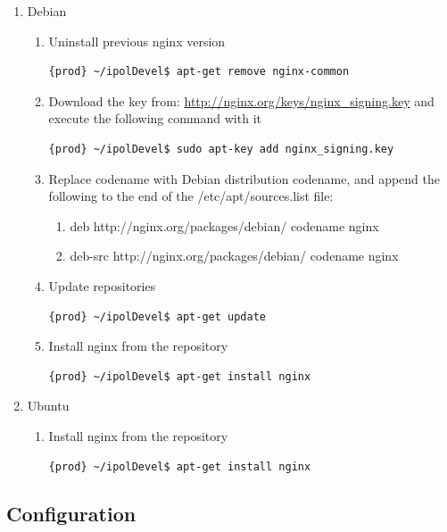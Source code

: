 \documentclass[a4paper,12pt]{article}
\begin{document}
\begin{enumerate}
\item Debian

\begin{enumerate}
\item Uninstall previous nginx version
\begin{lstlisting}[language=Bash]
{prod} ~/ipolDevel$ apt-get remove nginx-common
\end{lstlisting}

\item Download the key from: \url{http://nginx.org/keys/nginx_signing.key} and execute the following command with it
\begin{lstlisting}[language=Bash]
{prod} ~/ipolDevel$ sudo apt-key add nginx_signing.key
\end{lstlisting}

\item Replace codename with Debian distribution codename, and append the following to the end of the /etc/apt/sources.list file:
\begin{enumerate}
\item deb http://nginx.org/packages/debian/ codename nginx
\item deb-src http://nginx.org/packages/debian/ codename nginx
\end{enumerate}

\item Update repositories
\begin{lstlisting}[language=Bash]
{prod} ~/ipolDevel$ apt-get update
\end{lstlisting}

\item Install nginx from the repository
\begin{lstlisting}[language=Bash]
{prod} ~/ipolDevel$ apt-get install nginx
\end{lstlisting}

\end{enumerate}
\item Ubuntu
\begin{enumerate}
\item Install nginx from the repository
\begin{lstlisting}[language=Bash]
{prod} ~/ipolDevel$ apt-get install nginx
\end{lstlisting}
\end{enumerate}
\end{enumerate}

\subsection{Configuration}
\end{document}
